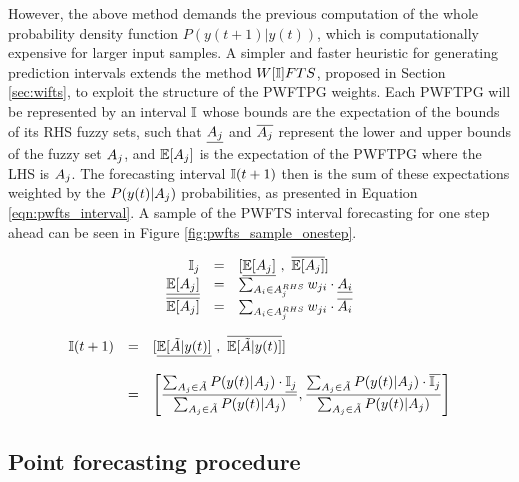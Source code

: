 However, the above method demands the previous computation of the whole probability density function $P( y(t+1) | y(t))$, which is computationally expensive for larger input samples. A simpler and faster heuristic for generating prediction intervals extends the method $W[\mathbb{I}]FTS$, proposed in Section \ref{sec:wifts}, to exploit the structure of the PWFTPG weights. Each PWFTPG will be represented by an interval $\mathbb{I}$ whose bounds are the expectation of the bounds of its RHS fuzzy sets, such that $\underline{A_j}$ and $\overline{A_j}$ represent the lower and upper bounds of the fuzzy set $A_j$, and $\mathbb{E}[ A_j ]$ is the expectation of the PWFTPG where the LHS is $A_j$. The forecasting interval  $\mathbb{I}(t+1)$ then is the sum of these expectations weighted by the $P(y(t)|A_j)$ probabilities, as presented in Equation \eqref{eqn:pwfts_interval}. A sample of the PWFTS interval forecasting for one step ahead can be seen in Figure \ref{fig:pwfts_sample_onestep}.

\begin{equation}
\begin{array}{rcl}
\intvl_j & = & \displaystyle [\underline{\mathbb{E}[ \ufset ]}\ ,\ \overline{\mathbb{E}[ \ufset ]}] \\
\underline{\mathbb{E}[ \ufset ]} & = & \sum_{A_i \in \ufset^{RHS}} w_{ji}\cdot \underline{A_i} \\ 
\overline{\mathbb{E}[ \ufset ]} & = & \sum_{A_i \in \ufset^{RHS}} w_{ji}\cdot \overline{A_i}
\end{array}
\end{equation}

\begin{equation}
\begin{array}{rcl}
\mathbb{I}(t+1) & = & \displaystyle [\underline{\mathbb{E}[ \tilde{A} | y(t) ]}\ ,\ \overline{\mathbb{E}[ \tilde{A} | y(t) ]}] \\
& & \\
& = & \displaystyle \left[\frac{\sum_{A_j \in \tilde{A}} P(y(t)|A_j)\cdot \underline{\mathbb{I}_j}}{\sum_{A_j \in \tilde{A}} P(y(t)|A_j)},\frac{\sum_{A_j \in \tilde{A}} P(y(t)|A_j)\cdot \overline{\mathbb{I}_j}}{\sum_{A_j \in \tilde{A}} P(y(t)|A_j)}\right]
\end{array}
\label{eqn:pwfts_interval}
\end{equation}

\subsection{Point forecasting procedure}
\label{sec:pwfts_point}

